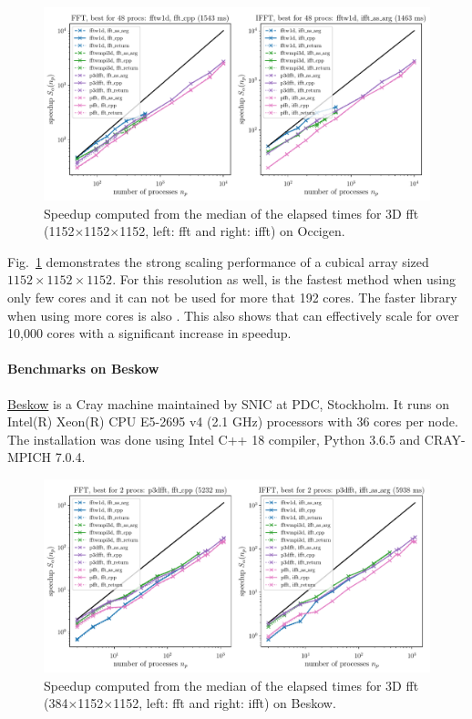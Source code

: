 \documentclass{../jors}
\begin{document}
\begin{figure}[htp!]
\centering
\includegraphics[width=\linewidth]{tmp/fig_occigen_1152x1152x1152}
\caption{Speedup computed from the median of the elapsed times for 3D fft
(1152$\times$1152$\times$1152, left: fft and right: ifft) on Occigen.}
\label{fig:occigen1152x1152x1152}
\end{figure}

Fig.~\ref{fig:occigen1152x1152x1152} demonstrates the strong scaling
performance of a cubical array sized $1152\times1152\times1152$. For this
resolution as well,  is the fastest method when using only
few cores and it can not be used for more that 192 cores. The faster library
when using more cores is also . This also shows that
 can effectively scale for over 10,000 cores with a significant
increase in speedup.


\paragraph{Benchmarks on Beskow}

\href{ https://www.pdc.kth.se/hpc-services/computing-systems}{Beskow} is a Cray
machine maintained by SNIC at PDC, Stockholm. It runs on Intel(R) Xeon(R) CPU
E5-2695 v4 (2.1 GHz) processors with 36 cores per node. The installation was
done using Intel C++ 18 compiler, Python 3.6.5 and CRAY-MPICH 7.0.4.

\begin{figure}[htp!]
\centering
\includegraphics[width=\linewidth]{tmp/fig_beskow_384x1152x1152}
\caption{Speedup computed from the median of the elapsed times for 3D fft
(384$\times$1152$\times$1152, left: fft and right: ifft) on Beskow.}
\label{fig:beskow384x1152x1152}
\end{figure}
\end{document}
